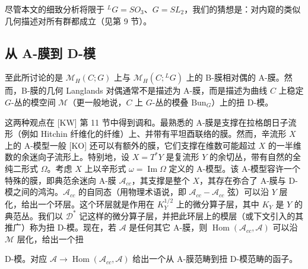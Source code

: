 \documentclass[11pt,a4paper]{article}
\newcommand{\Bun}{\mathrm{Bun}}
\begin{document}
尽管本文的细致分析将限于 ${}^{L}G=SO_3$、$G=SL_2$，我们的猜想是：对内窥的类似几何描述对所有群都成立（见第 9 节）。

\subsection{从 A-膜到 D-模}

至此所讨论的是 $\mathcal{M}_H(C;G)$ 上与 $\mathcal{M}_H(C;{}^{L}G)$ 上的 B-膜相对偶的 A-膜。然而，B-膜的几何 Langlands 对偶通常不是描述为 A-膜，而是描述为曲线 $C$ 上稳定 $G$-丛的模空间 $\mathcal{M}$（更一般地说，$C$ 上 $G$-丛的模叠 $\Bun_G$）上的扭 D-模。

这两种观点在 [KW] 第 11 节中得到调和。最熟悉的 A-膜是支撑在拉格朗日子流形（例如 Hitchin 纤维化的纤维）上、并带有平坦酉联络的膜。然而，辛流形 $X$ 上的 A-模型一般 [KO] 还可以有额外的膜，它们支撑在维数可能超过 $X$ 的一半维数的余迷向子流形上。特别地，设 $X=T^*Y$ 是复流形 $Y$ 的余切丛，带有自然的全纯二形式 $\Omega$。考虑 $X$ 上以辛形式 $\omega=\operatorname{Im}\Omega$ 定义的 A-模型。该 A-模型容许一个特殊的膜，即典范余迷向 A-膜 $\mathcal{A}_{cc}$，其支撑是整个 $X$，其存在弥合了 A-膜与 D-模之间的鸿沟。$\mathcal{A}_{cc}$ 的自同态（用物理术语说，即 $\mathcal{A}_{cc}-\mathcal{A}_{cc}$ 弦）可以沿 $Y$ 层化，给出一个环层。这个环层就是作用在 $K_Y^{1/2}$ 上的微分算子层，其中 $K_Y$ 是 $Y$ 的典范丛。我们以 $\mathcal{D}^*$ 记这样的微分算子层，并把此环层上的模层（或下文引入的其推广）称为扭 D-模。现在，若 $\mathcal{A}$ 是任何其它 A-膜，则 $\operatorname{Hom}(\mathcal{A}_{cc},\mathcal{A})$ 可以沿 $\mathcal{M}$ 层化，给出一个扭


D-模。对应 $\mathcal{A}\to\operatorname{Hom}(\mathcal{A}_{cc},\mathcal{A})$ 给出一个从 A-膜范畴到扭 D-模范畴的函子。
\end{document}
